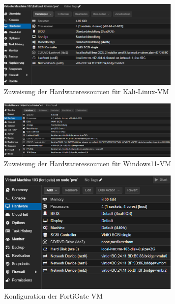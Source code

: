 \documentclass[12pt]{scrreprt}
\begin{document}
\begin{thebibliography}{99}
\begin{figure}[htbp]
	\centering
	\includegraphics[width=0.8\textwidth]{kalivm-hardware.png}
	\caption{Zuweisung der Hardwareressourcen für Kali-Linux-VM}
	\label{fig:kali-hardware} %
\end{figure}

\begin{figure}[htbp]
	\centering
	\includegraphics[width=0.8\textwidth]{win11-hardware.png}
	\caption{Zuweisung der Hardwareressourcen für Windows11-VM}
	\label{fig:win11-hardware} %
\end{figure}

\begin{figure}[htbp]
	\centering
	\includegraphics[width=0.8\textwidth]{fortivm-hardware.png}
	\caption{Konfiguration der FortiGate VM}
	\label{fig:fortivm-hardware} %
\end{figure}


\end{thebibliography}
\end{document}
